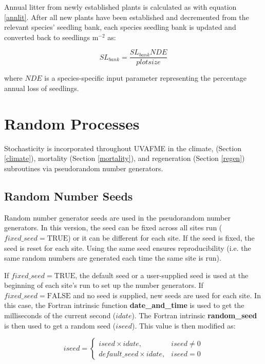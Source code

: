 \documentclass[a4paper, 12pt] {report}
\begin{document}
Annual litter from newly established plants is calculated as with equation \ref{annlit}. After all new plants have been established and decremented from the relevant species' seedling bank, each species seedling bank is updated and converted back to seedlings m$^{-2}$ as:

\begin{equation} 
SL_{bank} = \frac{SL_{bank}NDE}{plotsize}
\end{equation}

where $NDE$ is a species-specific input parameter representing the percentage annual loss of seedlings. 

\section{Random Processes} \label{random}

Stochasticity is incorporated throughout UVAFME in the climate, (Section \ref{climate}), mortality (Section \ref{mortality}), and regeneration (Section \ref{regen}) subroutines via pseudorandom number generators.

\subsection{Random Number Seeds}

Random number generator seeds are used in the pseudorandom number generators. In this version, the seed can be fixed across all sites run ($fixed\_seed = \text{TRUE}$) or it can be different for each site. If the seed is fixed, the seed is reset for each site. Using the same seed ensures reproducibility (i.e. the same random numbers are generated each time the same site is run). 

If $fixed\_seed = \text{TRUE}$, the default seed or a user-supplied seed is used at the beginning of each site's run to set up the number generators. If $fixed\_seed = \text{FALSE}$ and no seed is supplied, new seeds are used for each site. In this case, the Fortran intrinsic function \textbf{date\_and\_time} is used to get the milliseconds of the current second ($idate$). The Fortran intrinsic \textbf{random\_seed} is then used to get a random seed ($iseed$). This value is then modified as:

\begin{equation} 
iseed = \begin{cases}
iseed \times idate, & \text{$iseed \neq 0$} \\
default\_seed \times idate, & \text{$iseed = 0$}
\end{cases}
\end{equation}
\end{document}
